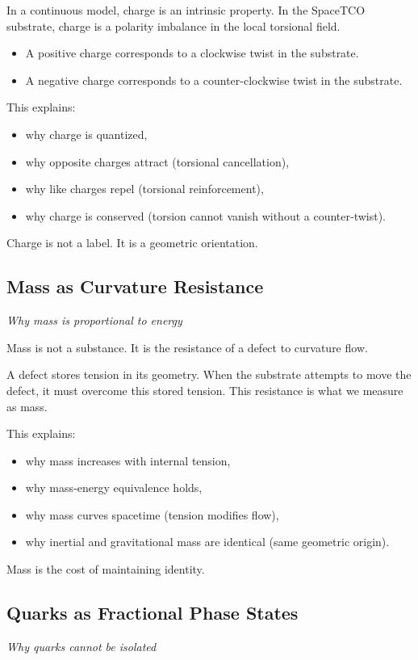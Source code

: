 \documentclass[reprint,amsmath,amssymb,aps,prl,floatfix]{revtex4-2}
\begin{document}
\begin{itemize}
In a continuous model, charge is an intrinsic property.  
In the SpaceTCO substrate, charge is a polarity imbalance in the local torsional field.
\begin{itemize}
\item A positive charge corresponds to a clockwise twist in the substrate.
\item A negative charge corresponds to a counter-clockwise twist in the substrate.
\end{itemize}

This explains:
\begin{itemize}
\item why charge is quantized,  
\item why opposite charges attract (torsional cancellation),  
\item why like charges repel (torsional reinforcement),  
\item why charge is conserved (torsion cannot vanish without a counter‑twist).
\end{itemize}

Charge is not a label.  
It is a geometric orientation.

\subsection{Mass as Curvature Resistance}
\textit{Why mass is proportional to energy}

Mass is not a substance.  
It is the resistance of a defect to curvature flow.
\medskip

A defect stores tension in its geometry.  
When the substrate attempts to move the defect, it must overcome this stored tension.  
This resistance is what we measure as mass.
\medskip

This explains:
\begin{itemize}
\item why mass increases with internal tension,  
\item why mass‑energy equivalence holds,  
\item why mass curves spacetime (tension modifies flow),  
\item why inertial and gravitational mass are identical (same geometric origin).
\end{itemize}
\medskip

Mass is the cost of maintaining identity.

\subsection{Quarks as Fractional Phase States}
\textit{Why quarks cannot be isolated}


\end{itemize}
\end{document}

